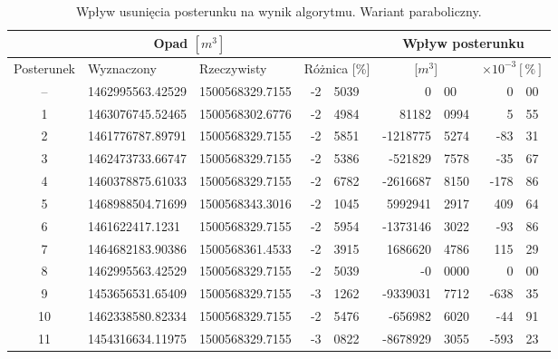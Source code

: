 \begin{table}[!ht]
\label{tab:wyniki_wymierna}
\caption{Wpływ usunięcia posterunku na wynik algorytmu. Wariant paraboliczny.}
\begin{center}
\begin{tabular}{|c|l|l|r@{.}l|r@{.}l|r@{.}l|}
\cline{2-3} \cline{6-9}
\multicolumn{1}{l}{} & \multicolumn{2}{|c|}{Opad $[m^3]$} & \multicolumn{2}{c}{} & \multicolumn{4}{|c|}{Wpływ posterunku} \\
\hline Posterunek & Wyznaczony & Rzeczywisty & \multicolumn{2}{c}{Różnica [\%]} & \multicolumn{2}{|c|}{[$m^3$]}& \multicolumn{2}{|c|}{$\times 10^{-3} [\%]$} \\ \hline \hline

--    &     1462995563.42529   &    1500568329.7155    &      -2 & 5039  &              0 & 00          &     0 & 00 \\ \hline
1   &     1463076745.52465   &    1500568302.6776    &      -2 & 4984  &          81182 & 0994   &     5 & 55 \\ \hline
2   &     1461776787.89791   &    1500568329.7155    &      -2 & 5851  &       -1218775 & 5274   &   -83 & 31 \\ \hline
3   &     1462473733.66747   &    1500568329.7155    &      -2 & 5386  &        -521829 & 7578   &   -35 & 67 \\ \hline
4   &     1460378875.61033   &    1500568329.7155    &      -2 & 6782  &       -2616687 & 8150   &  -178 & 86 \\ \hline
5   &     1468988504.71699   &    1500568343.3016    &      -2 & 1045  &        5992941 & 2917   &   409 & 64 \\ \hline
6   &     1461622417.1231    &    1500568329.7155    &      -2 & 5954  &       -1373146 & 3022   &   -93 & 86 \\ \hline
7   &     1464682183.90386   &    1500568361.4533    &      -2 & 3915  &        1686620 & 4786   &   115 & 29 \\ \hline
8   &     1462995563.42529   &    1500568329.7155    &      -2 & 5039  &             -0 & 0000   &     0 & 00 \\ \hline
9   &     1453656531.65409   &    1500568329.7155    &      -3 & 1262  &       -9339031 & 7712   &  -638 & 35 \\ \hline
10  &     1462338580.82334   &    1500568329.7155    &      -2 & 5476  &        -656982 & 6020   &   -44 & 91 \\ \hline
11  &     1454316634.11975   &    1500568329.7155    &      -3 & 0822  &       -8678929 & 3055   &  -593 & 23 \\ \hline

\end{tabular}
\end{center}
\end{table}
